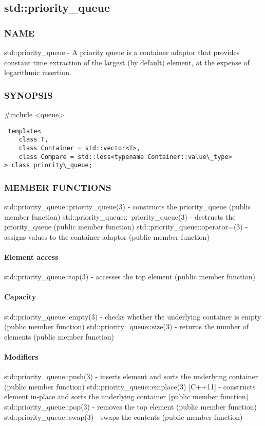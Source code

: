 \subsection{std::priority\_queue}

\subsubsection{NAME}
std::priority\_queue - A priority queue is a container adaptor that provides constant time extraction of the largest (by default) element, at the expense of logarithmic insertion.

\subsubsection{SYNOPSIS}
\#include <queue>

\begin{lstlisting}
 template<
    class T,
    class Container = std::vector<T>,
    class Compare = std::less<typename Container::value\_type>
> class priority\_queue;
\end{lstlisting}

\subsubsection{MEMBER FUNCTIONS}
std::priority\_queue::priority\_queue(3) - constructs the priority\_queue  (public member function)
std::priority\_queue::~priority\_queue(3) - destructs the priority\_queue  (public member function)
std::priority\_queue::operator=(3) - assigns values to the container adaptor  (public member function)
\paragraph{Element access}
std::priority\_queue::top(3) - accesses the top element   (public member function)
\paragraph{Capacity}
std::priority\_queue::empty(3) - checks whether the underlying container is empty   (public member function)
std::priority\_queue::size(3) - returns the number of elements   (public member function)
\paragraph{Modifiers}
std::priority\_queue::push(3) - inserts element and sorts the underlying container  (public member function)
std::priority\_queue::emplace(3) [C++11] - constructs element in-place and sorts the underlying container   (public member function)
std::priority\_queue::pop(3) - removes the top element   (public member function)
std::priority\_queue::swap(3) - swaps the contents   (public member function)


